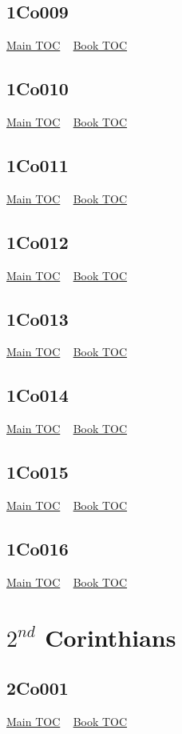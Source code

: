 \documentclass{book}
\begin{document}
  \section{1Co009}\hyperlink{toc}{Main TOC} ~ \hyperref[subsec:1Co]{Book TOC} 
  \section{1Co010}\hyperlink{toc}{Main TOC} ~ \hyperref[subsec:1Co]{Book TOC} 
  \section{1Co011}\hyperlink{toc}{Main TOC} ~ \hyperref[subsec:1Co]{Book TOC} 
  \section{1Co012}\hyperlink{toc}{Main TOC} ~ \hyperref[subsec:1Co]{Book TOC} 
  \section{1Co013}\hyperlink{toc}{Main TOC} ~ \hyperref[subsec:1Co]{Book TOC} 
  \section{1Co014}\hyperlink{toc}{Main TOC} ~ \hyperref[subsec:1Co]{Book TOC} 
  \section{1Co015}\hyperlink{toc}{Main TOC} ~ \hyperref[subsec:1Co]{Book TOC} 
  \section{1Co016}\hyperlink{toc}{Main TOC} ~ \hyperref[subsec:1Co]{Book TOC} 
  \chapter{$2^{nd}$ Corinthians} \label{subsec:2Co} \begin{multicols}{2} \minitoc \end{multicols}
  \section{2Co001}\hyperlink{toc}{Main TOC} ~ \hyperref[subsec:2Co]{Book TOC} 
\end{document}
